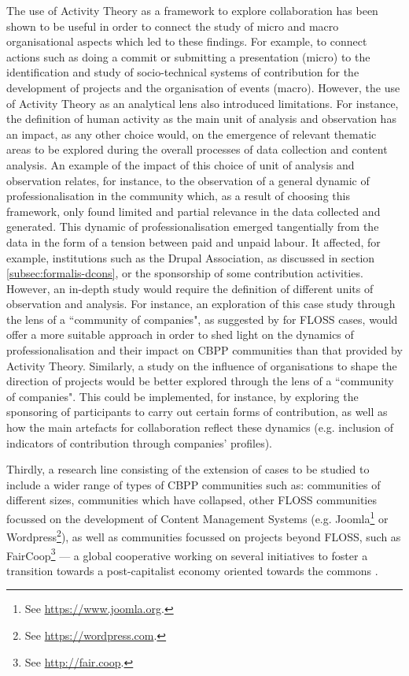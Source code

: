 The use of Activity Theory as a framework to explore collaboration has been shown to be useful in order to connect the study of micro and macro organisational aspects which led to these findings. For example, to connect actions such as doing a commit or submitting a presentation (micro) to the identification and study of socio-technical systems of contribution for the development of projects and the organisation of events (macro). However, the use of Activity Theory as an analytical lens also introduced limitations. For instance, the definition of human activity as the main unit of analysis and observation has an impact, as any other choice would, on the emergence of relevant thematic areas to be explored during the overall processes of data collection and content analysis. An example of the impact of this choice of unit of analysis and observation relates, for instance, to the observation of a general dynamic of professionalisation in the community which, as a result of choosing this framework, only found limited and partial relevance in the data collected and generated. This dynamic of professionalisation emerged tangentially from the data in the form of a tension between paid and unpaid labour.
It affected, for example, institutions such as the Drupal Association, as discussed in section \ref{subsec:formalis-dcons}, or the sponsorship of some contribution activities. However, an in-depth study would require the definition of different units of observation and analysis. For instance, an exploration of this case study through the lens of a ``community of companies", as suggested by \textcite{gonzalez2013understanding} for FLOSS cases, would offer a more suitable approach in order to shed light on the dynamics of professionalisation and their impact on CBPP communities than that provided by Activity Theory. Similarly, a study on the influence of organisations to shape the direction of projects would be better explored through the lens of a ``community of companies". This could be implemented, for instance, by exploring the sponsoring of participants to carry out certain forms of contribution, as well as how the main artefacts for collaboration reflect these dynamics (e.g. inclusion of indicators of contribution through companies' profiles).

Thirdly, a research line consisting of the extension of cases to be studied to include a wider range of types of CBPP communities such as: communities of different sizes, communities which have collapsed, other FLOSS communities focussed on the development of Content Management Systems (e.g. Joomla\footnote{See \url{https://www.joomla.org}.} or Wordpress\footnote{See \url{https://wordpress.com}.}), as well as communities focussed on projects beyond FLOSS, such as FairCoop\footnote{See \url{http://fair.coop}.} --- a global cooperative working on several initiatives to foster a transition towards a post-capitalist economy oriented towards the commons \parencite{faircoop-faq:2017:Online}.

